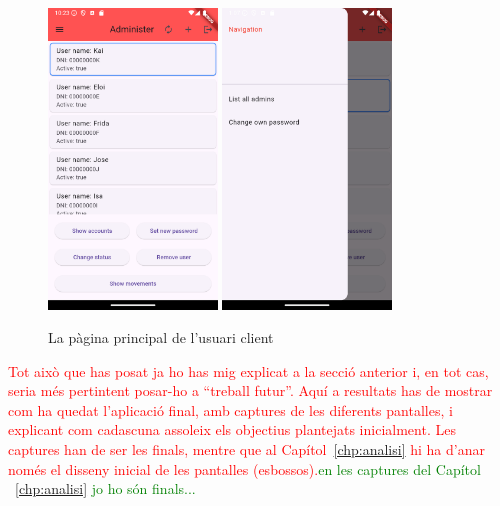 \documentclass[a4paper,12pt,twoside]{ThesisStyle}
\newcommand{\pau}[1]{\textcolor{red}{#1}}
\newcommand{\sudan}[1]{\textcolor{green}{#1}}
\begin{document}
\begin{figure}[h]   
    \centering
    \includegraphics[width=0.4\textwidth]{imatges/adminMainpage.png}
    \includegraphics[width=0.4\textwidth]{imatges/adminNavigation.png}
    \caption{La pàgina principal de l'usuari client}
    \label{fig: La pàgina principal de l'usuari client}
\end{figure}




\pau{Tot això que has posat ja ho has mig explicat a la secció anterior i, en tot cas, seria més pertintent posar-ho a ``treball futur''. Aquí a resultats has de mostrar com ha quedat l'aplicació final, amb captures de les diferents pantalles, i explicant com cadascuna assoleix els objectius plantejats inicialment. Les captures han de ser les finals, mentre que al Capítol~\ref{chp:analisi} hi ha d'anar només el disseny inicial de les pantalles (esbossos).}\sudan{en les captures del Capítol ~\ref{chp:analisi} jo ho són finals...}
\end{document}

